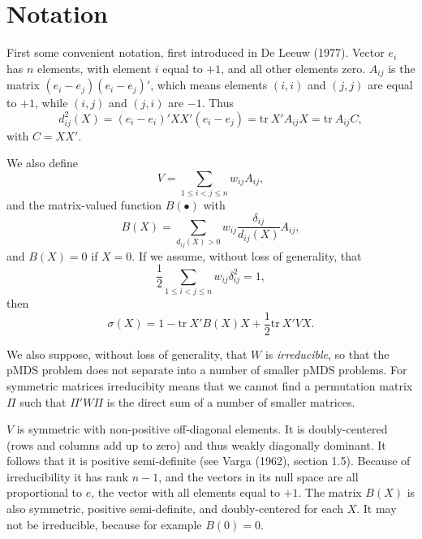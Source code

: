 \documentclass[12pt,]{article}
\begin{document}
\hypertarget{notation}{%
\section{Notation}\label{notation}}

First some convenient notation, first introduced in De Leeuw (1977).
Vector \(e_i\) has \(n\) elements, with element \(i\) equal to \(+1\),
and all other elements zero. \(A_{ij}\) is the matrix
\((e_i-e_j)(e_i-e_j)'\), which means elements \((i,i)\) and \((j,j)\)
are equal to \(+1\), while \((i,j)\) and \((j,i)\) are \(-1\). Thus
\begin{equation}\label{E:anot}
d_{ij}^2(X)=(e_i-e_i)'XX'(e_i-e_j)=\text{tr}\ X'A_{ij}X=\text{tr}\ A_{ij}C,
\end{equation} with \(C=XX'\).

We also define \begin{equation}\label{E:V}
V=\mathop{\sum}_{1\leq i<j\leq n}w_{ij}A_{ij},
\end{equation} and the matrix-valued function \(B(\bullet)\) with
\begin{equation}\label{E:B}
B(X)=\mathop{\sum}_{d_{ij}(X)>0}w_{ij}\frac{\delta_{ij}}{d_{ij}(X)}A_{ij},
\end{equation} and \(B(X)=0\) if \(X=0\). If we assume, without loss of
generality, that \[
\frac12\mathop{\sum}_{1\leq i<j\leq n}w_{ij}\delta_{ij}^2=1,
\] then \begin{equation}\label{E:S}
\sigma(X)=1-\text{tr}\ X'B(X)X+\frac12\text{tr}\ X'VX.
\end{equation}

We also suppose, without loss of generality, that \(W\) is
\emph{irreducible}, so that the pMDS problem does not separate into a
number of smaller pMDS problems. For symmetric matrices irreducibity
means that we cannot find a permutation matrix \(\Pi\) such that
\(\Pi'W\Pi\) is the direct sum of a number of smaller matrices.

\(V\) is symmetric with non-positive off-diagonal elements. It is
doubly-centered (rows and columns add up to zero) and thus weakly
diagonally dominant. It follows that it is positive semi-definite (see
Varga (1962), section 1.5). Because of irreducibility it has rank
\(n-1\), and the vectors in its null space are all proportional to
\(e\), the vector with all elements equal to \(+1\). The matrix \(B(X)\)
is also symmetric, positive semi-definite, and doubly-centered for each
\(X\). It may not be irreducible, because for example \(B(0)=0\).
\end{document}
